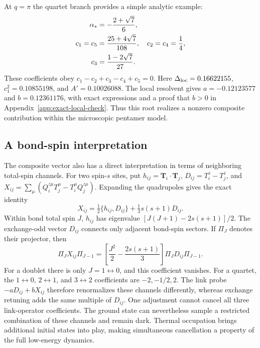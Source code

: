 At $q=\pi$ the quartet branch provides a simple analytic example:
\begin{align}
 \alpha_*&=-\frac{2+\sqrt7}{6},\notag\\
 c_1=c_5&=\frac{25+4\sqrt7}{108},\quad
 c_2=c_4=\frac14,\notag\\
 c_3&=\frac{1-2\sqrt7}{27}.
 \label{eq:rank-exact-root}
\end{align}
These coefficients obey $c_1-c_2+c_3-c_4+c_5=0$.
Here $\Delta_{\mathrm{loc}}=0.16622155$, $c_1^2=0.10855198$, and
$A'=0.10026088$. The local resolvent gives $a=-0.12123577$ and
$b=0.12361176$, with exact expressions and a proof that $b>0$ in
Appendix~\ref{app:exact-local-check}. Thus this root realizes a nonzero
composite contribution within the microscopic pentamer model.

\subsection{A bond-spin interpretation}

The composite vector also has a direct interpretation in terms of neighboring
total-spin channels. For two spin-$s$ sites, put
$h_{ij}=\bm T_i\cdot\bm T_j$, $D_{ij}=T_i^z-T_j^z$, and
$X_{ij}=\sum_\mu(Q_i^{z\mu}T_j^\mu-T_i^\mu Q_j^{z\mu})$.
Expanding the quadrupoles gives the exact identity
\begin{equation}
 X_{ij}=\tfrac12\{h_{ij},D_{ij}\}+\tfrac13s(s+1)D_{ij}.
 \label{eq:bond-identity}
\end{equation}
Within bond total spin $J$, $h_{ij}$ has eigenvalue
$[J(J+1)-2s(s+1)]/2$. The exchange-odd vector $D_{ij}$ connects only
adjacent bond-spin sectors. If $\Pi_J$ denotes their projector, then
\begin{equation}
 \Pi_J X_{ij}\Pi_{J-1}=
 \left[\frac{J^2}{2}-\frac{2s(s+1)}{3}\right]
 \Pi_J D_{ij}\Pi_{J-1}.
 \label{eq:bond-channel}
\end{equation}
For a doublet there is only $J=1\leftrightarrow0$, and this coefficient
vanishes. For a quartet, the $1\leftrightarrow0$, $2\leftrightarrow1$,
and $3\leftrightarrow2$ coefficients are $-2,-1/2,2$.
The link probe $-aD_{ij}+bX_{ij}$ therefore renormalizes these channels
differently, whereas exchange retuning adds the same multiple of $D_{ij}$.
One adjustment cannot cancel all three link-operator coefficients.
The ground state can nevertheless sample a restricted combination of
these channels and remain dark. Thermal occupation brings additional
initial states into play, making simultaneous cancellation a property
of the full low-energy dynamics.
